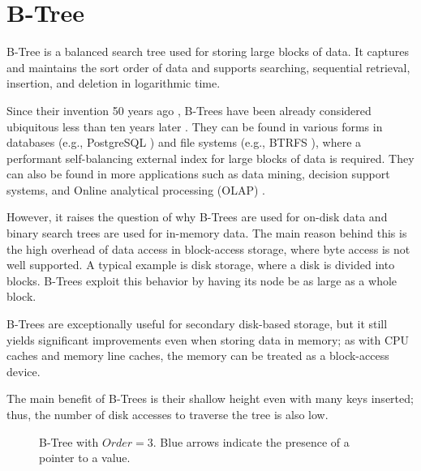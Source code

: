 \section{B-Tree}\label{section:b-tree}

B-Tree is a balanced search tree used for storing large blocks of data. It captures and maintains the sort order of data and supports searching, sequential retrieval, insertion, and deletion in logarithmic time.

Since their invention 50 years ago \cite{bayer-org}, B-Trees have been already considered ubiquitous less than ten years later \cite{10.1145/356770.356776}. They can be found in various forms in databases (e.g., PostgreSQL \cite{postgresql}) and file systems (e.g., BTRFS \cite{btrfs}), where a performant self-balancing external index for large blocks of data is required. They can also be found in more applications such as data mining, decision support systems, and Online analytical processing (OLAP) \cite{olap,goetz-tech}.

However, it raises the question of why B-Trees are used for on-disk data and binary search trees are used for in-memory data. The main reason behind this is the high overhead of data access in block-access storage, where byte access is not well supported. A typical example is disk storage, where a disk is divided into blocks. B-Trees exploit this behavior by having its node be as large as a whole block.

B-Trees are exceptionally useful for secondary disk-based storage, but it still yields significant improvements even when storing data in memory; as with CPU caches and memory line caches, the memory can be treated as a block-access device.

The main benefit of B-Trees is their shallow height even with many keys inserted; thus, the number of disk accesses to traverse the tree is also low.

\begin{figure}[H]
  \centering
  
  \caption[B-Tree with $\mathit{Order} = 3$.]{B-Tree with $\mathit{Order} = 3$. Blue arrows indicate the presence of a pointer to a value.}
  \label{figure:b-tree}
\end{figure}

